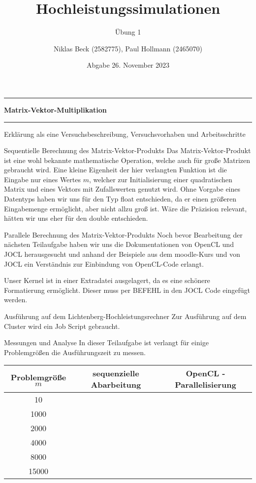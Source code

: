 \documentclass[
ngerman,
subtask=ruled %
]{tudaexercise}
\begin{document}
	
	\title[Übung Hochleistungssimulationen]{Hochleistungssimulationen}
	\subtitle{\"Ubung 1}
	\author{Niklas Beck (2582775), Paul Hollmann (2465070)}
	\date{Abgabe 26. November 2023}
	\maketitle
	
	\hrule
	{\Large \textbf{Matrix-Vektor-Multiplikation}}
	\hrule
	
	Erklärung als eine Versuchsbeschreibung, Versuchsvorhaben und Arbeitsschritte
	
	\begin{task}{Sequentielle Berechnung des Matrix-Vektor-Produkts}
		Das Matrix-Vektor-Produkt ist eine wohl bekannte mathematische Operation, welche auch für große Matrizen gebraucht wird.
		Eine kleine Eigenheit der hier verlangten Funktion ist die Eingabe nur eines Wertes $m$, welcher zur Initialisierung einer quadratischen Matrix und eines Vektors mit Zufallswerten genutzt wird.
		Ohne Vorgabe eines Datentyps haben wir uns für den Typ float entschieden, da er einen größeren Eingabemenge ermöglicht, aber nicht allzu groß ist. Wäre die Präzision relevant, hätten wir uns eher für den double entschieden.
	\end{task}
	
	
	\begin{task}{Parallele Berechnung des Matrix-Vektor-Produkts}
		Noch bevor Bearbeitung der nächsten Teilaufgabe haben wir uns die Dokumentationen von OpenCL und JOCL herausgesucht und anhand der Beispiele aus dem moodle-Kurs und von JOCL ein Verständnis zur Einbindung von OpenCL-Code erlangt.
		
		Unser Kernel ist in einer Extradatei ausgelagert, da es eine schönere Formatierung ermöglicht.
		Dieser muss per BEFEHL in den JOCL Code eingefügt werden.
	\end{task}
	
	
	\begin{task}{Ausführung auf dem Lichtenberg-Hochleistungsrechner} 
		Zur Ausführung auf dem Cluster wird ein Job Script gebraucht.
		
	\end{task}

	\begin{task}{Messungen und Analyse} 
		In dieser Teilaufgabe ist verlangt für einige Problemgrößen die Ausführungszeit zu messen.
		
		\begin{tabular}{|c|c|c|}
			\hline
			Problemgröße $m$ & sequenzielle Abarbeitung & OpenCL - Parallelisierung \\
			\hline
			10 &  &  \\
			\hline
			1000 &  &  \\
			\hline
			2000 &  &  \\
			\hline
			4000 &  &  \\
			\hline
			8000 &  &  \\
			\hline
			15000 &  &  \\
			\hline
		\end{tabular}
	\end{task}
\end{document}
